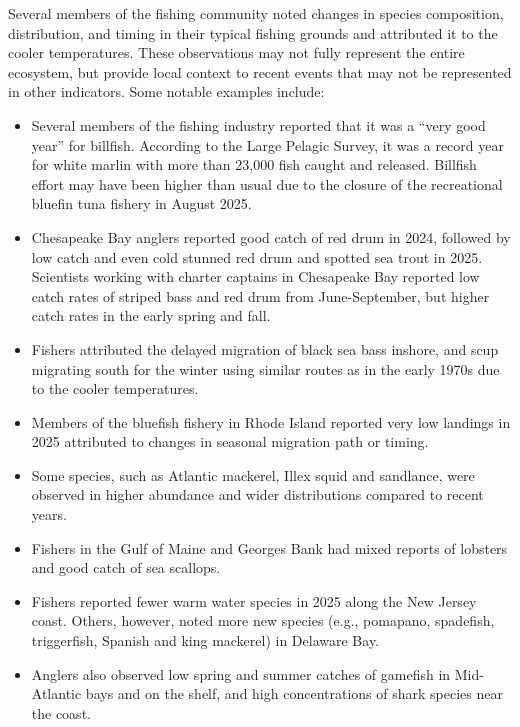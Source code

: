 \documentclass[
  10pt,
]{article}
\providecommand{\tightlist}{%
  \setlength{\itemsep}{0pt}\setlength{\parskip}{0pt}}
\begin{document}
Several members of the fishing community noted changes in species composition, distribution, and timing in their typical fishing grounds and attributed it to the cooler temperatures. These observations may not fully represent the entire ecosystem, but provide local context to recent events that may not be represented in other indicators. Some notable examples include:

\begin{itemize}
\tightlist
\item
  Several members of the fishing industry reported that it was a ``very good year'' for billfish. According to the Large Pelagic Survey, it was a record year for white marlin with more than 23,000 fish caught and released. Billfish effort may have been higher than usual due to the closure of the recreational bluefin tuna fishery in August 2025.
\item
  Chesapeake Bay anglers reported good catch of red drum in 2024, followed by low catch and even cold stunned red drum and spotted sea trout in 2025. Scientists working with charter captains in Chesapeake Bay reported low catch rates of striped bass and red drum from June-September, but higher catch rates in the early spring and fall.
\item
  Fishers attributed the delayed migration of black sea bass inshore, and scup migrating south for the winter using similar routes as in the early 1970s due to the cooler temperatures.
\item
  Members of the bluefish fishery in Rhode Island reported very low landings in 2025 attributed to changes in seasonal migration path or timing.
\item
  Some species, such as Atlantic mackerel, Illex squid and sandlance, were observed in higher abundance and wider distributions compared to recent years.
\item
  Fishers in the Gulf of Maine and Georges Bank had mixed reports of lobsters and good catch of sea scallops.
\item
  Fishers reported fewer warm water species in 2025 along the New Jersey coast. Others, however, noted more new species (e.g., pomapano, spadefish, triggerfish, Spanish and king mackerel) in Delaware Bay.
\item
  Anglers also observed low spring and summer catches of gamefish in Mid-Atlantic bays and on the shelf, and high concentrations of shark species near the coast.
\end{itemize}
\end{document}
